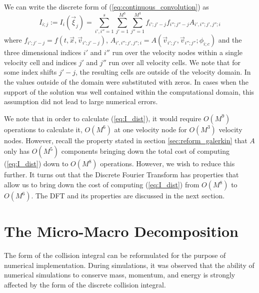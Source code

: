 \documentclass[12pt]{CSUNthesis}
\begin{document}
We can write the discrete form of (\ref{eq:continuous_convolution}) as 
\begin{equation}
\label{eq:I_dist}
I_{i;j}:=I_{i}(\vec{\xi}_{j}) = \sum_{i',i''=1}^s  \sum_{j'=1}^{M^3} \sum_{j''=1}^{M^3} f_{i';j'-j} f_{i'';j''-j} A_{i',i'';j',j'';i} 
\end{equation}
where $f_{i';j'-j}=f(t,\vec{x},\vec{v}_{i';j'-j})$, 
$A_{i',i'';j',j'';i}=A(\vec{v}_{i';j'},\vec{v}_{i'';j''}; \phi_{i;c})$ and the three dimensional 
indices $i'$ and $i''$ run over the velocity nodes within a single velocity cell 
and indices $j'$ and $j''$ run over all velocity cells. We note that for some index 
shifts $j'-j$, the resulting cells are outside of the velocity domain. 
In \cite{AlekseenkoJosyula2012a} the values outside of the domain 
were substituted with zeros. In cases when the support of the solution 
was well contained within the computational domain, this assumption did not lead to 
large numerical errors. 

We note that in order to calculate (\ref{eq:I_dist}), it would require $O(M^9)$ operations to calculate it, $O(M^6)$ at one velocity node for $O(M^3)$ velocity nodes. However, recall the property stated in section \ref{sec:reform_galerkin} that $A$ only has $O(M^5)$ components bringing down the total cost of computing (\ref{eq:I_dist}) down to $O(M^8)$ operations. However, we wish to reduce this further. It turns out that the Discrete Fourier Transform has properties that allow us to bring down the cost of computing (\ref{eq:I_dist}) from $O(M^8)$ to $O(M^6)$. The DFT and its properties are discussed in the next section.

\section{The Micro-Macro Decomposition}
The form of the collision integral can be reformulated for the purpose of numerical implementation. During simulations, it was observed that the ability of numerical simulations to conserve mass, momentum, and energy is strongly affected by the form of the discrete collision integral. 
\end{document}
